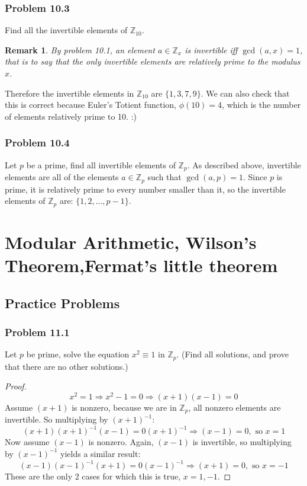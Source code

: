 \documentclass[hidelinks,12pt]{article}
\newtheorem*{remark}{Remark}
\newcommand{\Z}{\mathbb{Z}}
\begin{document}
\subsubsection{Problem 10.3}
Find all the invertible elements of $\Z_{10}$.
\newline \begin{remark}
By problem 10.1, an element $a\in\Z_{x}$ is invertible iff $\gcd{(a,x)}=1$, that is to say that the only invertible elements are relatively prime to the modulus $x$.\end{remark}
Therefore the invertible elements in $\Z_{10}$ are $\{1,3,7,9\}$. We can also check that this is correct because Euler's Totient function, $\phi(10)=4$, which is the number of elements relatively prime to 10. :)
\subsubsection{Problem 10.4}
Let $p$ be a prime, find all invertible elements of $\Z_{p}$.
\newline As described above, invertible elements are all of the elements $a\in\Z_{p}$ such that $\gcd{(a,p)=1}$. Since $p$ is prime, it is relatively prime to every number smaller than it, so the invertible elements of $\Z_{p}$ are: $\{1,2,...,p-1\}$.
\newpage
\section{Modular Arithmetic, Wilson’s Theorem,\newline Fermat’s little theorem}
\subsection{Practice Problems}
\subsubsection{Problem 11.1}
Let $p$ be prime, solve the equation $x^2\equiv1$ in $\Z_p$. (Find all solutions, and prove that there are no other solutions.)
\begin{proof}
$$x^2=1\Longrightarrow x^2-1=0\Longrightarrow(x+1)(x-1)=0$$ Assume $(x+1)$ is nonzero, because we are in $\Z_p$, all nonzero elements are invertible. So multiplying by $(x+1)^{-1}$: $$(x+1)(x+1)^{-1}(x-1)=0(x+1)^{-1}\Longrightarrow(x-1)=0,\text{ so }x=1$$ Now assume $(x-1)$ is nonzero. Again, $(x-1)$ is invertible, so multiplying by $(x-1)^{-1}$ yields a similar result:$$(x-1)(x-1)^{-1}(x+1)=0(x-1)^{-1}\Longrightarrow(x+1)=0,\text{ so }x=-1$$ These are the only 2 cases for which this is true, $x=1,-1$.
\end{proof}
\end{document}
